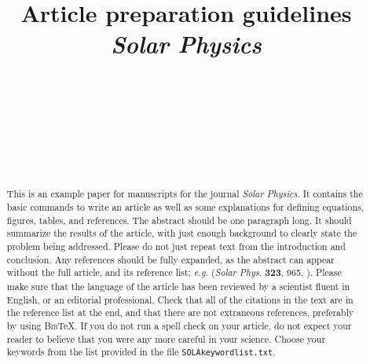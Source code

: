 \documentclass[namedreferences]{solarphysics}
\newcommand{\BibTeX}{\textsc{Bib}\TeX}
\newcommand{\solphys}{{\it Solar Phys.}}
\begin{document}
\begin{article}
\begin{opening}

\title{Article preparation guidelines\\ {\it Solar Physics}}

\author[addressref={aff1,aff2,aff3},corref,email={e-mail.a@mail.com}]{~}%
\author[addressref=aff1,email={e-mail.b@mail.com}]{~}%
\author[corref,email={e-mail.c@mail.com}]{~}%
\author{~}

\address[id=aff1]{First very very very very very very very very very
 very very very very very very very very very very very very very very very very very very long affiliation}
\address[id=aff2]{Second affiliation}
\address[id=aff3]{Third affiliation}


\begin{abstract}
This is an example paper for manuscripts for the journal {\it Solar 
Physics}. It contains the basic commands to write an article as well 
as some explanations for defining equations, figures, tables,
and references.    
The abstract should be one paragraph long.  It should summarize
the results of the article, with just enough background to clearly state the
problem being addressed.
Please do not just repeat text from the introduction and conclusion.
Any references should be fully expanded, as the abstract can appear 
without the full article, and its reference list; 
{\it e.g.} \citeauthor{Dupont07} (\solphys{} \textbf{323}, 965, 
\citeyear{Dupont07}).
Please make sure that the language of the article has been reviewed by a
scientist fluent in English, or an editorial professional.
Check that all of the citations in the text are in the reference list at the
end, and that there are not extraneous references, preferably by using 
\BibTeX . If you do not run a spell check on your article, do not expect 
your reader to believe that you were any more careful in your science. 
Choose your keywords from the list provided in the file 
\texttt{SOLA\us keyword\us list.txt}.  
\end{abstract}
\end{opening}


\end{article}
\end{document}
